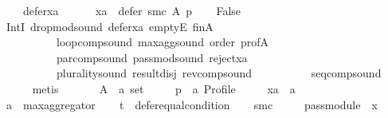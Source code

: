 \begin{isabellebody}
\ \ \ \ defer{\isacharunderscore}{\kern0pt}xa{\isacharcolon}{\kern0pt}\isanewline
\ \ \ \ \ \ {\isachardoublequoteopen}xa\ {\isasymin}\ defer\ {\isacharparenleft}{\kern0pt}{\isacharquery}{\kern0pt}smc{\isacharparenright}{\kern0pt}\ A\ p{\isachardoublequoteclose}\isanewline
\ \ \isamarkupfalse%
\ {\isachardoublequoteopen}False{\isachardoublequoteclose}\isanewline
\ \ \ \ \isamarkupfalse%
\ IntI\ drop{\isacharunderscore}{\kern0pt}mod{\isacharunderscore}{\kern0pt}sound\ defer{\isacharunderscore}{\kern0pt}xa\ emptyE\ fin{\isacharunderscore}{\kern0pt}A\isanewline
\ \ \ \ \ \ \ \ \ \ loop{\isacharunderscore}{\kern0pt}comp{\isacharunderscore}{\kern0pt}sound\ max{\isacharunderscore}{\kern0pt}agg{\isacharunderscore}{\kern0pt}sound\ order\ prof{\isacharunderscore}{\kern0pt}A\isanewline
\ \ \ \ \ \ \ \ \ \ par{\isacharunderscore}{\kern0pt}comp{\isacharunderscore}{\kern0pt}sound\ pass{\isacharunderscore}{\kern0pt}mod{\isacharunderscore}{\kern0pt}sound\ reject{\isacharunderscore}{\kern0pt}xa\isanewline
\ \ \ \ \ \ \ \ \ \ plurality{\isacharunderscore}{\kern0pt}sound\ result{\isacharunderscore}{\kern0pt}disj\ rev{\isacharunderscore}{\kern0pt}comp{\isacharunderscore}{\kern0pt}sound\isanewline
\ \ \ \ \ \ \ \ \ \ seq{\isacharunderscore}{\kern0pt}comp{\isacharunderscore}{\kern0pt}sound\isanewline
\ \ \ \ \isamarkupfalse%
\ metis\isanewline
{}\isamarkupfalse%
\isanewline
\ \ \isamarkupfalse%
\isanewline
\ \ \ \ A\ {\isacharcolon}{\kern0pt}{\isacharcolon}{\kern0pt}\ {\isachardoublequoteopen}{\isacharprime}{\kern0pt}a\ set{\isachardoublequoteclose}\ \isanewline
\ \ \ \ p\ {\isacharcolon}{\kern0pt}{\isacharcolon}{\kern0pt}\ {\isachardoublequoteopen}{\isacharprime}{\kern0pt}a\ Profile{\isachardoublequoteclose}\ \isanewline
\ \ \ \ xa\ {\isacharcolon}{\kern0pt}{\isacharcolon}{\kern0pt}\ {\isachardoublequoteopen}{\isacharprime}{\kern0pt}a{\isachardoublequoteclose}\isanewline
\ \ \isamarkupfalse%
\ {\isacharquery}{\kern0pt}a\ {\isacharequal}{\kern0pt}\ {\isachardoublequoteopen}max{\isacharunderscore}{\kern0pt}aggregator{\isachardoublequoteclose}\isanewline
\ \ \isamarkupfalse%
\ {\isacharquery}{\kern0pt}t\ {\isacharequal}{\kern0pt}\ {\isachardoublequoteopen}defer{\isacharunderscore}{\kern0pt}equal{\isacharunderscore}{\kern0pt}condition{\isachardoublequoteclose}\isanewline
\ \ \isamarkupfalse%
\ {\isacharquery}{\kern0pt}smc\ {\isacharequal}{\kern0pt}\isanewline
\ \ \ \ {\isachardoublequoteopen}pass{\isacharunderscore}{\kern0pt}module\ {}\ x\ {\isasymtriangleright}\isanewline

\end{isabellebody}
